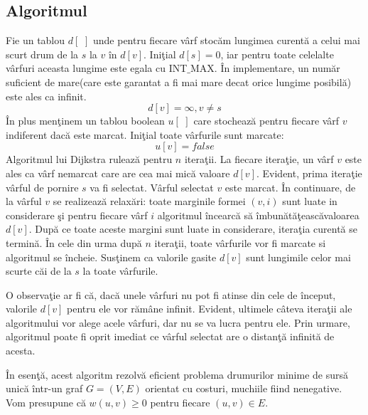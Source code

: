 \documentclass[11pt,a4paper]{report}
\begin{document}
    \subsection{Algoritmul}
    Fie un tablou $d[\,\,]$ unde pentru fiecare v\^ arf stoc\u am lungimea curent\u a a celui mai scurt drum de la $s$ la $v$ \^ in $d[v]$. Ini\c tial $d[s]=0$, iar pentru toate celelalte v\^ arfuri aceasta lungime este egala cu INT$\_$MAX. \^ In implementare, un num\u ar suficient de mare(care este garantat a fi mai mare decat orice lungime posibil\u a) este ales ca infinit.
    \begin{equation*}
    d[v]=\infty,v\neq s
    \end{equation*}
    \^ In plus men\c tinem un tablou boolean $u[\,\,]$ care stocheaz\u a pentru fiecare v\^ arf $v$ indiferent dac\u a este marcat. Ini\c tial toate v\^ arfurile sunt marcate:
    \begin{equation*}
    u[v]=false
    \end{equation*}
    Algoritmul lui Dijkstra ruleaz\u a pentru $n$ itera\c tii. La fiecare itera\c tie, un v\^ arf $v$ este ales ca v\^ arf nemarcat care are cea mai mic\u a valoare $d[v]$. Evident, prima itera\c tie v\^ arful de pornire $s$ va fi selectat. V\^ arful selectat $v$ este marcat. \^ In continuare, de la v\^ arful $v$ se realizeaz\u a relax\u ari: toate marginile formei $(v,i)$ sunt luate in considerare \c si pentru fiecare v\^ arf $i$ algoritmul \^ incearc\u a s\u a \^ imbun\u at\u a\c teasc\u avaloarea $d[v]$.   
    Dup\u a ce toate aceste margini sunt luate in considerare, itera\c tia curent\u a se termin\u a. \^ In cele din urma dup\u a $n$ itera\c tii, toate v\^ arfurile vor fi marcate si algoritmul se \^ incheie. Sus\c tinem ca valorile gasite $d[v]$ sunt lungimile celor mai scurte c\u ai de la $s$ la toate v\^ arfurile.
    
    O observa\c tie ar fi c\u a, dac\u a unele v\^ arfuri nu pot fi atinse din cele de \^ inceput, valorile $d[v]$ pentru ele vor r\u am\^ ane infinit. Evident, ultimele c\^ ateva itera\c tii ale algoritmului vor alege acele v\^ arfuri, dar nu se va lucra pentru ele. Prin urmare, algoritmul poate fi oprit imediat ce v\^ arful selectat are o distan\c t\u a infinit\u a de acesta. 
    
    \^ In esen\c t\u a, acest algoritm rezolv\u a eficient problema drumurilor minime de surs\u a unic\u a \^ intr-un graf $G=(V,E)$ orientat cu costuri, muchiile fiind nenegative. Vom presupune c\u a $w(u,v)\ge 0$ pentru fiecare $(u,v)\in E$.
    
\end{document}
